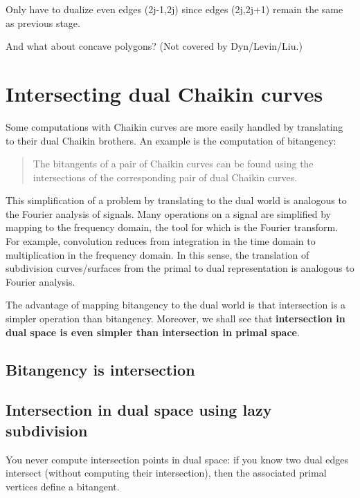\documentclass[12pt]{article}
\begin{document}
Only have to dualize even edges (2j-1,2j) since 
edges (2j,2j+1) remain the same as previous stage.

And what about concave polygons? (Not covered by Dyn/Levin/Liu.)

\clearpage


\section{Intersecting dual Chaikin curves}

Some computations with Chaikin curves are more easily handled by translating
to their dual Chaikin brothers.
An example is the computation of bitangency:
\begin{quote}
The bitangents of a pair of Chaikin curves can be found using the intersections
of the corresponding pair of dual Chaikin curves.
\end{quote}
This simplification of a problem by translating to the dual world is analogous
to the Fourier analysis of signals.
Many operations on a signal are simplified by mapping to the frequency domain,
the tool for which is the Fourier transform.
For example, convolution reduces from integration in the time domain
to multiplication in the frequency domain.
In this sense, the translation of subdivision curves/surfaces from the primal to
dual representation is analogous to Fourier analysis.

The advantage of mapping bitangency to the dual world is that intersection is a simpler
operation than bitangency.
Moreover, we shall see that {\bf intersection in dual space is even simpler than intersection
in primal space}.

\subsection{Bitangency is intersection}

\subsection{Intersection in dual space using lazy subdivision}

You never compute intersection points in dual space:
if you know two dual edges intersect (without computing their intersection),
then the associated primal vertices define a bitangent.
\end{document}
